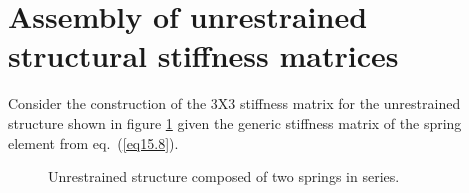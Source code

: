 \documentclass{AeroStructure-ERJohnson}
\begin{document}
\section{Assembly of unrestrained structural stiffness matrices}\label{sec15.3}
Consider the construction of the 3X3 stiffness matrix for the unrestrained structure shown in figure \ref{fig15.11} given the generic stiffness matrix of the spring element from eq.~(\ref{eq15.8}).


{\def\thefigure{15.11}
\begin{figure}[h]
\caption{Unrestrained structure composed of two springs in series.\label{fig15.11}}
\end{figure}
}
\end{document}
